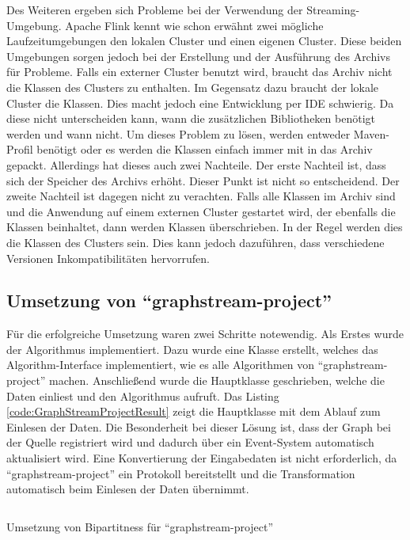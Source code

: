 Des Weiteren ergeben sich Probleme bei der Verwendung der Streaming-Umgebung.
Apache Flink kennt wie schon erwähnt zwei mögliche Laufzeitumgebungen den lokalen
Cluster und einen eigenen Cluster. Diese beiden Umgebungen sorgen jedoch bei
der Erstellung und der Ausführung des Archivs für Probleme. Falls ein externer
Cluster benutzt wird, braucht das Archiv nicht die Klassen des Clusters zu
enthalten. Im Gegensatz dazu braucht der lokale Cluster die Klassen. Dies macht
jedoch eine Entwicklung per \gls{IDE} schwierig. Da diese nicht unterscheiden
kann, wann die zusätzlichen Bibliotheken benötigt werden und wann nicht. Um
dieses Problem zu lösen, werden entweder Maven-Profil benötigt oder es werden
die Klassen einfach immer mit in das Archiv gepackt. Allerdings hat dieses auch
zwei Nachteile. Der erste Nachteil ist, dass sich der Speicher des Archivs
erhöht. Dieser Punkt ist nicht so entscheidend. Der zweite Nachteil ist dagegen
nicht zu verachten. Falls alle Klassen im Archiv sind und die Anwendung auf
einem externen Cluster gestartet wird, der ebenfalls die Klassen beinhaltet,
dann werden Klassen überschrieben. In der Regel werden dies die Klassen des
Clusters sein. Dies kann jedoch dazuführen, dass verschiedene Versionen
Inkompatibilitäten hervorrufen.

\subsection{Umsetzung von \enquote{graphstream-project}}
Für die erfolgreiche Umsetzung waren zwei Schritte notewendig. Als Erstes wurde
der Algorithmus implementiert. Dazu wurde eine Klasse erstellt, welches das
Algorithm-Interface implementiert, wie es alle Algorithmen von
\enquote{graphstream-project} machen. Anschließend wurde die Hauptklasse
geschrieben, welche die Daten einliest und den Algorithmus aufruft.
Das Listing \ref{code:GraphStreamProjectResult} zeigt die Hauptklasse mit dem
Ablauf zum Einlesen der Daten. Die Besonderheit bei dieser Lösung ist, dass
der Graph bei der Quelle registriert wird und dadurch über ein Event-System
automatisch aktualisiert wird. Eine Konvertierung der Eingabedaten ist nicht
erforderlich, da \enquote{graphstream-project} ein Protokoll bereitstellt und
die Transformation automatisch beim Einlesen der Daten übernimmt.

\begin{listing}
\inputminted[breaklines=true]{java}{../material/code/GraphStreamProjectResult.java}
\caption{Umsetzung von Bipartitness für \enquote{graphstream-project}}
\label{code:GraphStreamProjectResult}
\end{listing}

